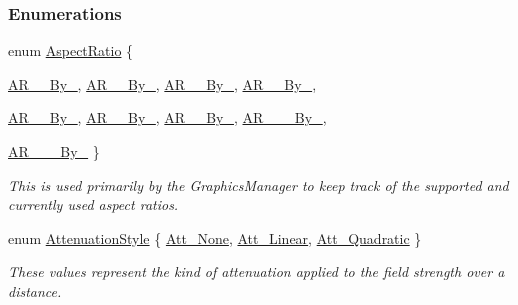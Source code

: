 \subsubsection*{Enumerations}
\begin{DoxyCompactItemize}
\item 
enum \hyperlink{namespaceMezzanine_a4f14cccd98d1bdc1bf934c1c028e3eaf}{AspectRatio} \{ \par
\hyperlink{namespaceMezzanine_a4f14cccd98d1bdc1bf934c1c028e3eafa4f3ca4673d11774b77de4b1c51be122b}{AR\_\_\-By\_}, 
\hyperlink{namespaceMezzanine_a4f14cccd98d1bdc1bf934c1c028e3eafaa7ca7a1749373d75bec977396ea8af3c}{AR\_\_\-By\_}, 
\hyperlink{namespaceMezzanine_a4f14cccd98d1bdc1bf934c1c028e3eafaac26ee01f52f68b3a67beccc4ee4f950}{AR\_\_\-By\_}, 
\hyperlink{namespaceMezzanine_a4f14cccd98d1bdc1bf934c1c028e3eafae7297c6f8720aa5453ea9cbc270ec149}{AR\_\_\-By\_}, 
\par
\hyperlink{namespaceMezzanine_a4f14cccd98d1bdc1bf934c1c028e3eafaad0586105b44a5d1b093a8d072d3e297}{AR\_\_\-By\_}, 
\hyperlink{namespaceMezzanine_a4f14cccd98d1bdc1bf934c1c028e3eafabd1801766c3dd81470e785a604fb8db2}{AR\_\_\-By\_}, 
\hyperlink{namespaceMezzanine_a4f14cccd98d1bdc1bf934c1c028e3eafa037068693e5a954da062e4f6122d1ad7}{AR\_\_\-By\_}, 
\hyperlink{namespaceMezzanine_a4f14cccd98d1bdc1bf934c1c028e3eafa14073edea666339eb6fdaa3ca23e946d}{AR\_\_\_\-By\_}, 
\par
\hyperlink{namespaceMezzanine_a4f14cccd98d1bdc1bf934c1c028e3eafaa95e86e3db402a75a3de756247da4b29}{AR\_\_\_\-By\_}
 \}
\begin{DoxyCompactList}\small\item\em This is used primarily by the GraphicsManager to keep track of the supported and currently used aspect ratios. \item\end{DoxyCompactList}\item 
enum \hyperlink{namespaceMezzanine_a2d10a79e11a2031df10af540eede12fa}{AttenuationStyle} \{ \hyperlink{namespaceMezzanine_a2d10a79e11a2031df10af540eede12faa548ff9c1d108b12ea6323d39c41856f5}{Att\_\-None}, 
\hyperlink{namespaceMezzanine_a2d10a79e11a2031df10af540eede12faaaecc4b0547a61e5b2abd5401182c9470}{Att\_\-Linear}, 
\hyperlink{namespaceMezzanine_a2d10a79e11a2031df10af540eede12faa7f0c2854461a843af7eb21c036375e83}{Att\_\-Quadratic}
 \}
\begin{DoxyCompactList}\small\item\em These values represent the kind of attenuation applied to the field strength over a distance. \item\end{DoxyCompactList}\item 

\end{DoxyCompactItemize}

